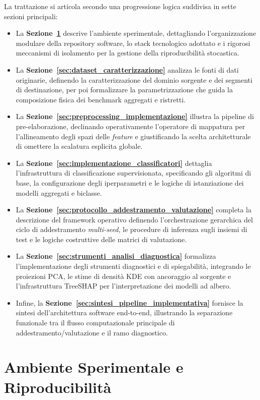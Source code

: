 La trattazione si articola secondo una progressione logica suddivisa in sette sezioni principali:
\begin{itemize}
    \item La \textbf{Sezione~\ref{sec:ambiente_sperimentale}} descrive l'ambiente sperimentale, dettagliando l'organizzazione modulare della repository software, lo stack tecnologico adottato e i rigorosi meccanismi di isolamento per la gestione della riproducibilità stocastica.
    \item La \textbf{Sezione~\ref{sec:dataset_caratterizzazione}} analizza le fonti di dati originarie, definendo la caratterizzazione del dominio sorgente e dei segmenti di destinazione, per poi formalizzare la parametrizzazione che guida la composizione fisica dei benchmark aggregati e ristretti.
    \item La \textbf{Sezione~\ref{sec:preprocessing_implementazione}} illustra la pipeline di pre-elaborazione, declinando operativamente l'operatore di mappatura per l'allineamento degli spazi delle \textit{feature} e giustificando la scelta architetturale di omettere la scalatura esplicita globale.
    \item La \textbf{Sezione~\ref{sec:implementazione_classificatori}} dettaglia l'infrastruttura di classificazione supervisionata, specificando gli algoritmi di base, la configurazione degli iperparametri e le logiche di istanziazione dei modelli aggregati e biclasse.
    \item La \textbf{Sezione~\ref{sec:protocollo_addestramento_valutazione}} completa la descrizione del framework operativo definendo l'orchestrazione gerarchica del ciclo di addestramento \textit{multi-seed}, le procedure di inferenza sugli insiemi di test e le logiche costruttive delle matrici di valutazione.
    \item La \textbf{Sezione~\ref{sec:strumenti_analisi_diagnostica}} formalizza l'implementazione degli strumenti diagnostici e di spiegabilità, integrando le proiezioni PCA, le stime di densità KDE con ancoraggio al sorgente e l'infrastruttura TreeSHAP per l'interpretazione dei modelli ad albero.
    \item Infine, la \textbf{Sezione~\ref{sec:sintesi_pipeline_implementativa}} fornisce la sintesi dell'architettura software end-to-end, illustrando la separazione funzionale tra il flusso computazionale principale di addestramento/valutazione e il ramo diagnostico.
\end{itemize}

\section{Ambiente Sperimentale e Riproducibilità}
\label{sec:ambiente_sperimentale}


